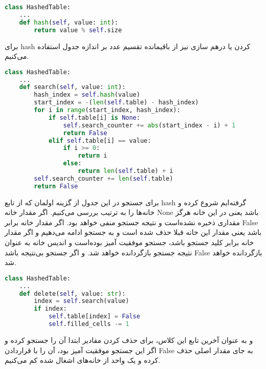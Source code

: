 \documentclass[]{article}
\begin{document}
\begin{latin}
\begin{lstlisting}[language=Python]
class HashedTable:
    ...
    def hash(self, value: int):
        return value % self.size
\end{lstlisting}
\end{latin}

برای hash کردن یا درهم سازی نیز از باقیمانده تقسیم عدد بر اندازه جدول استفاده می‌کنیم.

\begin{latin}
\begin{lstlisting}[language=Python]
class HashedTable:
    ...
    def search(self, value: int):
        hash_index = self.hash(value)
        start_index = -(len(self.table) - hash_index)
        for i in range(start_index, hash_index):
            if self.table[i] is None:
                self.search_counter += abs(start_index - i) + 1
                return False
            elif self.table[i] == value:
                if i >= 0:
                    return i
                else:
                    return len(self.table) + i
        self.search_counter += len(self.table)
        return False
\end{lstlisting}
\end{latin}

برای جستجو در این جدول از گزینه اولمان که از تابع hash گرفته‌ایم شروع کرده
و خانه‌ها را به ترتیب بررسی می‌کنیم.
اگر مقدار خانه None باشد یعنی در این خانه هرگز مقداری ذخیره نشده‌است و نتیجه جستجو منفی خواهد بود.
اگر مقدار خانه برابر False باشد یعنی مقدار این خانه قبلا حذف شده است و به جستجو ادامه می‌دهیم
و اگر مقدار خانه برابر کلید جستجو باشد، جستجو موفقیت آمیز بوده‌است و اندیس خانه
به عنوان نتیجه جستجو بازگردانده خواهد شد.
و اگر جستجو بی‌نتیجه باشد False بازگردانده خواهد شد.

\begin{latin}
\begin{lstlisting}[language=Python]
class HashedTable:
    ...
    def delete(self, value: str):
        index = self.search(value)
        if index:
            self.table[index] = False
            self.filled_cells -= 1
\end{lstlisting}
\end{latin}

و به عنوان آخرین تابع این کلاس، برای حذف کردن مقادیر ابتدا آن را جستجو کرده و
اگر این جستجو موفقیت آمیز بود، آن را با قراردادن False به جای مقدار اصلی حذف کرده
و یک واحد از خانه‌های اشغال شده کم می‌کنیم.
\end{document}
